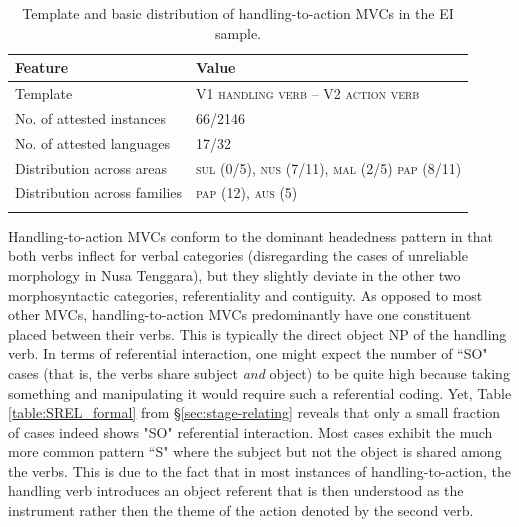 \begin{table}
\begin{tabular}{ll}
\lsptoprule
Feature&Value\tabularnewline
\midrule
Template&V1 \textsc{handling verb} -- V2 \textsc{action verb}\tabularnewline
No. of attested instances& 66/2146 \tabularnewline
No. of attested languages& 17/32 \tabularnewline
Distribution across areas& \textsc{sul} (0/5), \textsc{nus} (7/11), \textsc{mal} (2/5) \textsc{pap} (8/11) \tabularnewline
Distribution across families& \textsc{pap} (12), \textsc{aus} (5) \tabularnewline
\lspbottomrule
\end{tabular}
\caption[Template and basic distribution of handling-to-action MVCs]{Template and basic distribution of handling-to-action MVCs in the EI sample.}
\label{table:handling-to-action}
\end{table}

Handling-to-action MVCs conform to the dominant headedness pattern in that both verbs inflect for verbal categories (disregarding the cases of unreliable morphology in Nusa Tenggara), but they slightly deviate in the other two morphosyntactic categories, referentiality and contiguity. As opposed to most other MVCs, handling-to-action MVCs predominantly have one constituent placed between their verbs. This is typically the direct object NP of the handling verb. In terms of referential interaction, one might expect the number of ``SO" cases (that is, the verbs share subject \emph{and} object) to be quite high because taking something and manipulating it would require such a referential coding. Yet, Table \ref{table:SREL_formal} from §\ref{sec:stage-relating} reveals that only a small fraction of cases indeed shows "SO" referential interaction. Most cases exhibit the much more common pattern ``S" where the subject but not the object is shared among the verbs. This is due to the fact that in most instances of handling-to-action, the handling verb introduces an object referent that is then understood as the instrument rather then the theme of the action denoted by the second verb. 

